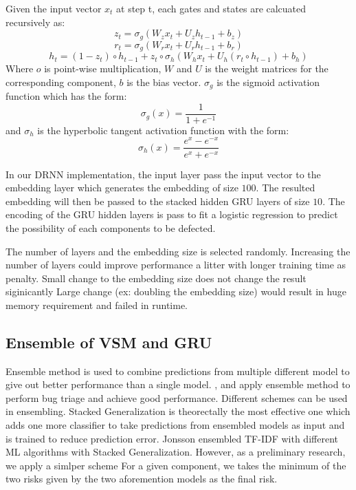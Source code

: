 Given the input vector $x_t$ at step t, each gates and states are calcuated recursively as:
\begin{equation}
	z_t = \sigma_g(W_zx_t+U_{z}h_{t-1}+b_z)
\end{equation}	
\begin{equation}
	r_t =  \sigma_g(W_rx_t+U_{r}h_{t-1}+b_r)
\end{equation}	
\begin{equation}
	h_t=(1-z_t) \circ h_{t-1} + z_t \circ \sigma_h(W_hx_t+U_{h}(r_t \circ h_{t-1})+b_h)
\end{equation}
Where $o$ is point-wise multiplication, $W$ and $U$ is the weight matrices for the corresponding component, $b$ is the bias vector.
$\sigma_g$ is the sigmoid activation function which has the form:
\begin{equation}
	\sigma_g(x) = \frac{1}{1+e^{-1}}
\end{equation}
and $\sigma_h$ is the hyperbolic tangent activation function with the form:
\begin{equation}
\sigma_h(x)=\frac{e^x - e^{-x}}{e^x + e^{-x}}	
\end{equation}

In our DRNN implementation, the input layer pass the input vector to the embedding layer which generates the embedding of size $100$.
The resulted embedding will then be passed to the stacked hidden GRU layers of size $10$.
The encoding of the GRU hidden layers is pass to fit a logistic regression to predict the possibility of each components to be defected.


The number of layers and the embedding size is selected randomly. 
Increasing the number of layers could improve performance a litter with longer training time as penalty.
Small change to the embedding size does not change the result siginicantly
Large change (ex: doubling the embedding size) would result in huge memory requirement and failed in runtime.


\subsection{Ensemble of VSM and GRU}
Ensemble method \cite{dietterich2000ensemble} is used to combine predictions from multiple different model to give out better performance than a single model.	
\cite{lam2017bug} ,\cite{wang2014version} and \cite{jonsson2016automated} apply ensemble method to perform bug triage and achieve good performance. 
Different schemes can be used in ensembling. 
Stacked Generalization\cite{wolpert1992stacked} is theorectally the most effective one which adds one more classifier to take predictions from ensembled models as input and is trained to reduce prediction error.  
Jonsson \etal \cite{jonsson2016automated} ensembled TF-IDF with different ML algorithms with Stacked Generalization.
However, as a preliminary research, we apply a simlper scheme 
For a given component, we takes the minimum of the two risks given by the two aforemention models as the final risk.

